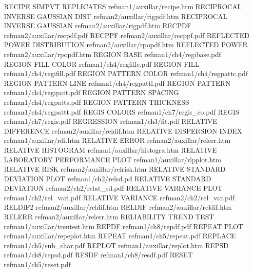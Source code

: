 RECIPE SIMPVT REPLICATES                refman1/auxillar/recipe.htm
RECIPROCAL INVERSE GAUSSIAN DIST        refman2/auxillar/rigpdf.htm
RECIPROCAL INVERSE GAUSSIAN             refman2/auxillar/rigpdf.htm
RECPDF                                  refman2/auxillar/recpdf.pdf
RECPPF                                  refman2/auxillar/recppf.pdf
REFLECTED POWER DISTRIBUTION            refman2/auxillar/rpopdf.htm
REFLECTED POWER                         refman2/auxillar/rpopdf.htm
REGION BASE                             refman1/ch4/regibase.pdf
REGION FILL COLOR                       refman1/ch4/regfillc.pdf
REGION FILL                             refman1/ch4/regifill.pdf
REGION PATTERN COLOR                    refman1/ch4/regpattc.pdf
REGION PATTERN LINE                     refman1/ch4/regpattl.pdf
REGION PATTERN                          refman1/ch4/regipatt.pdf
REGION PATTERN SPACING                  refman1/ch4/regpatts.pdf
REGION PATTERN THICKNESS                refman1/ch4/regpattt.pdf
REGIS COLORS                            refman1/ch7/regis_co.pdf
REGIS                                   refman1/ch7/regis.pdf
REGRESSION                              refman1/ch3/fit.pdf
RELATIVE DIFFERENCE                     refman2/auxillar/reldif.htm
RELATIVE DISPERSION INDEX               refman1/auxillar/rdi.htm
RELATIVE ERROR                          refman2/auxillar/relerr.htm
RELATIVE HISTOGRAM                      refman1/auxillar/histogra.htm
RELATIVE LABORATORY PERFORMANCE PLOT    refman1/auxillar/rlpplot.htm
RELATIVE RISK                           refman2/auxillar/relrisk.htm
RELATIVE STANDARD DEVIATION PLOT        refman1/ch2/relsd.pd
RELATIVE STANDARD DEVIATION             refman2/ch2/relat_sd.pdf
RELATIVE VARIANCE PLOT                  refman1/ch2/rel_vari.pdf
RELATIVE VARIANCE                       refman2/ch2/rel_var.pdf
RELDIF2                                 refman2/auxillar/reldif.htm
RELDIF                                  refman2/auxillar/reldif.htm
RELERR                                  refman2/auxillar/relerr.htm
RELIABILITY TREND TEST                  refman1/auxillar/trentest.htm
REPDF                                   refman1/ch8/repdf.pdf
REPEAT PLOT                             refman1/auxillar/repeplot.htm
REPEAT                                  refman1/ch5/repeat.pdf
REPLACE                                 refman1/ch5/sub_char.pdf
REPLOT                                  refman1/auxillar/replot.htm
REPSD                                   refman1/ch8/repsd.pdf
RESDF                                   refman1/ch8/resdf.pdf
RESET                                   refman1/ch5/reset.pdf
